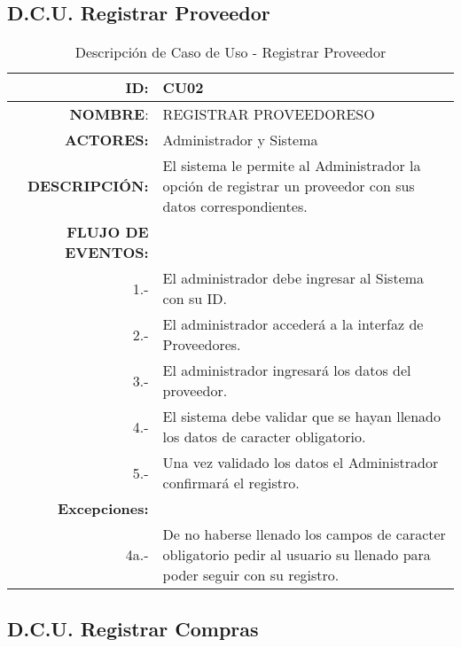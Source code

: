 \documentclass[a4paper,11pt, spanish]{report}
\begin{document}
{{{{{{{{{{{{{{{\subsection{D.C.U. Registrar Proveedor}

  {\renewcommand{\arraystretch}{1.25}%
  \begin{table}[H]
  \begin{tabularx}{\textwidth}{r|X}
  \textbf{ID}: & CU02\\\hline
  \textbf{NOMBRE}: & REGISTRAR PROVEEDORESO\\\hline
  \textbf{ACTORES:} & Administrador y Sistema \\\hline
  \textbf{DESCRIPCIÓN:} & El sistema le permite al Administrador la opción de registrar un proveedor con sus datos correspondientes. \\\hline
  \textbf{FLUJO DE EVENTOS:}  \\
  1.- & El administrador debe ingresar al Sistema con su ID.\\
  2.- & El administrador accederá a la interfaz de Proveedores.\\
  3.- & El administrador ingresará los datos del proveedor.\\
  4.- & El sistema debe validar que se hayan llenado los datos de caracter obligatorio.\\
  5.- & Una vez validado los datos el Administrador confirmará el registro. \\\hline
  \textbf{Excepciones:} & \\
  4a.- & De no haberse llenado los campos de caracter obligatorio pedir al usuario su llenado para poder seguir con su registro.
  \end{tabularx}
  \caption{Descripción de Caso de Uso - Registrar Proveedor}
  \end{table}

\subsection{D.C.U. Registrar Compras}

}}}}}}}}}}}}}}}}
\end{document}
